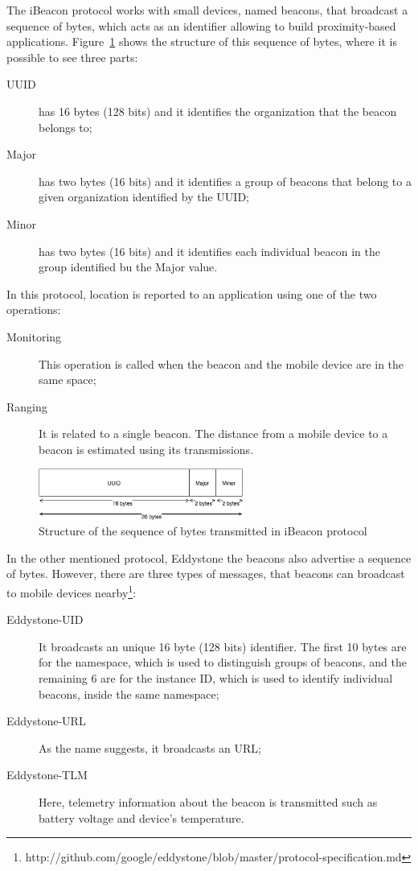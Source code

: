 The iBeacon protocol works with small devices, named beacons, that broadcast a sequence of bytes, which acts as an identifier allowing to build proximity-based applications\cite{ibeacon_book}.
Figure~\ref{fig:ibeacon_message} shows the structure of this sequence of bytes, where it is possible to see three parts:
\begin{description}
  \item[\gls{UUID}] has 16 bytes (128 bits) and it identifies the organization that the beacon belongs to;
  \item[Major] has two bytes (16 bits) and it identifies a group of beacons that belong to a given organization identified by the \gls{UUID};
  \item[Minor] has two bytes (16 bits) and it identifies each individual beacon in the group identified bu the Major value.
\end{description}
In this protocol, location is reported to an application using one of the two operations:
\begin{description}
  \item[Monitoring] This operation is called when the beacon and the mobile device are in the same space;
  \item[Ranging] It is related to a single beacon. The distance from a mobile device to a beacon is estimated using its transmissions.
\end{description}

\begin{figure}[!ht]
  \centering
    \includegraphics[width=0.6\textwidth, keepaspectratio]{images/ibeacon_message}
    \caption[iBeacon message structure]{Structure of the sequence of bytes transmitted in iBeacon protocol}
    \label{fig:ibeacon_message}
\end{figure}

In the other mentioned protocol, Eddystone the beacons also advertise a sequence of bytes.
However, there are three types of messages, that beacons can broadcast to mobile devices nearby\footnote{http://github.com/google/eddystone/blob/master/protocol-specification.md}:
\begin{description}
  \item[Eddystone-UID]
  It broadcasts an unique 16 byte (128 bits) identifier. The first 10 bytes are for the namespace, which is used to distinguish groups of beacons, and the remaining 6 are for the instance \gls{ID}, which is used to identify individual beacons, inside the same namespace;
  \item[Eddystone-URL]
  As the name suggests, it broadcasts an \gls{URL};
  \item[Eddystone-TLM]
  Here, telemetry information about the beacon is transmitted such as battery voltage and device's temperature.
\end{description}

